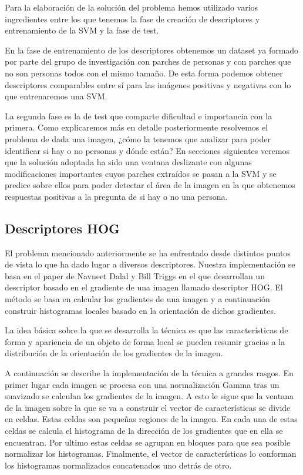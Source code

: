 \documentclass[a4paper,12pt]{article}
\begin{document}
Para la elaboración de la solución del problema hemos utilizado varios ingredientes entre los que tenemos la fase de creación de descriptores y entrenamiento de la SVM y la fase de test.

En la fase de entrenamiento de los descriptores obtenemos un dataset ya formado por parte del grupo de investigación con parches de personas y con parches que no son personas todos con el mismo tamaño. De esta forma podemos obtener descriptores comparables entre sí para las imágenes positivas y negativas con lo que entrenaremos una SVM.

La segunda fase es la de test que comparte dificultad e importancia con la primera. Como explicaremos más en detalle posteriormente resolvemos el problema de dada una imagen, ¿cómo la tenemos que analizar para poder identificar si hay o no personas y dónde están? En secciones siguientes veremos que la solución adoptada ha sido una ventana deslizante con algunas modificaciones importantes cuyos parches extraídos se pasan a la SVM y se predice sobre ellos para poder detectar el área de la imagen en la que obtenemos respuestas positivas a la pregunta de si hay o no una persona.

\subsection{Descriptores HOG}

El problema mencionado anteriormente se ha enfrentado desde
distintos puntos de vista lo que ha dado lugar a diversos
descriptores. Nuestra implementación se basa en el paper de
Navneet Dalal y Bill Triggs en el que desarrollan un descriptor
basado en el gradiente de una imagen llamado descriptor HOG.
El método se basa en calcular los gradientes de una imagen y a
continuación construir histogramas locales basado en la
orientación de dichos gradientes.

La idea básica sobre la que se desarrolla la técnica es que las
características de forma y apariencia de un objeto de forma local
se pueden resumir gracias a la distribución de la orientación de
los gradientes de la imagen.

A continuación se describe la implementación de la técnica a
grandes rasgos. En primer lugar cada imagen se procesa con una
normalización Gamma tras un suavizado se calculan los gradientes
de la imagen. A esto le sigue que la ventana de la imagen sobre la
que se va a construir el vector de características se divide en
celdas. Estas celdas son pequeñas regiones de la imagen. En cada
una de estas celdas se calcula el histograma de la dirección de
los gradientes que en ella se encuentran. Por ultimo estas
celdas se agrupan en bloques para que sea posible normalizar los
histogramas. Finalmente, el vector de características lo conforman
los histogramas normalizados concatenados uno detrás de otro.
\end{document}
